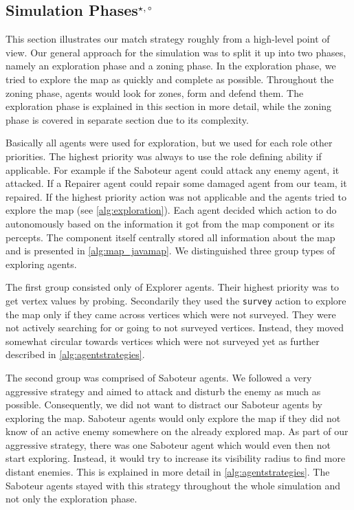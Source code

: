 \subsection[Simulation Phases]{Simulation Phases$^{\star,\circ}$}\label{arc:simulation}
This section illustrates our match strategy roughly from a high-level point of view.
Our general approach for the simulation was to split it up into two phases, namely an exploration phase and a zoning phase.
In the exploration phase, we tried to explore the map as quickly and complete as possible.
Throughout the zoning phase, agents would look for zones, form and defend them.
The exploration phase is explained in this section in more detail, while the zoning phase is covered in separate section due to its complexity.

Basically all agents were used for exploration, but we used for each role other priorities.
The highest priority was always to use the role defining ability if applicable.
For example if the Saboteur agent could attack any enemy agent, it attacked.
If a Repairer agent could repair some damaged agent from our team, it repaired.
If the highest priority action was not applicable and the agents tried to explore the map (see \autoref{alg:exploration}).
Each agent decided which action to do autonomously based on the information it got from the map component or its percepts.
The component itself centrally stored all information about the map and is presented in \autoref{alg:map_javamap}.
We distinguished three group types of exploring agents.

The first group consisted only of Explorer agents.
Their highest priority was to get vertex values by probing.
Secondarily they used the \texttt{survey} action to explore the map only if they came across vertices which were not surveyed.
They were not actively searching for or going to not surveyed vertices.
Instead, they moved somewhat circular towards vertices which were not surveyed yet as further described in \autoref{alg:agentstrategies}.

The second group was comprised of Saboteur agents.
We followed a very aggressive strategy and aimed to attack and disturb the enemy as much as possible.
Consequently, we did not want to distract our Saboteur agents by exploring the map.
Saboteur agents would only explore the map if they did not know of an active enemy somewhere on the already explored map.
As part of our aggressive strategy, there was one Saboteur agent which would even then not start exploring.
Instead, it would try to increase its visibility radius to find more distant enemies.
This is explained in more detail in \autoref{alg:agentstrategies}.
The Saboteur agents stayed with this strategy throughout the whole simulation and not only the exploration phase.

